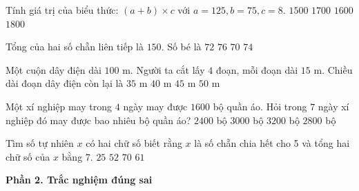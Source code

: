 \begin{ex} %
Tính giá trị của biểu thức: $(a + b) \times c$ với $a = 125, b = 75, c = 8$.
\choice
{$1500$}
{$1700$}
{\True $1600$}
{$1800$}
\end{ex}

\begin{ex} %
Tổng của hai số chẵn liên tiếp là $150$. Số bé là
\choice
{$72$}
{$76$}
{$70$}
{\True $74$}
\end{ex}

\begin{ex} %
Một cuộn dây điện dài $100\text{ m}$. Người ta cắt lấy $4$ đoạn, mỗi đoạn dài $15\text{ m}$. Chiều dài đoạn dây điện còn lại là
\choice
{$35\text{ m}$}
{\True $40\text{ m}$}
{$45\text{ m}$}
{$50\text{ m}$}
\end{ex}

\begin{ex} %
Một xí nghiệp may trong $4$ ngày may được $1600$ bộ quần áo. Hỏi trong $7$ ngày xí nghiệp đó may được bao nhiêu bộ quần áo?
\choice
{$2400$ bộ}
{$3000$ bộ}
{$3200$ bộ}
{\True $2800$ bộ}
\end{ex}

\begin{ex} %
Tìm số tự nhiên $x$ có hai chữ số biết rằng $x$ là số chẵn chia hết cho 5 và tổng hai chữ số của $x$ bằng 7.
\choice
{$25$}
{$52$}
{\True $70$}
{$61$}
\end{ex}

\textbf{Phần 2. Trắc nghiệm đúng sai}

